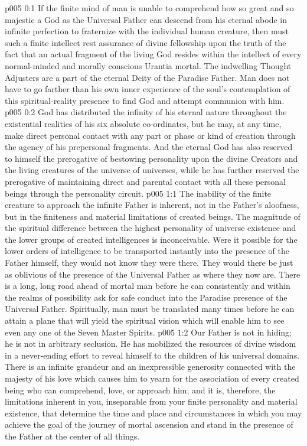 \author{Divine Counselor}
\vs p005 0:1 If the finite mind of man is unable to comprehend how so great and so majestic a God as the Universal Father can descend from his eternal abode in infinite perfection to fraternize with the individual human creature, then must such a finite intellect rest assurance of divine fellowship upon the truth of the fact that an actual fragment of the living God resides within the intellect of every normal\hyp{}minded and morally conscious Urantia mortal. The indwelling Thought Adjusters are a part of the eternal Deity of the Paradise Father. Man does not have to go farther than his own inner experience of the soul’s contemplation of this spiritual\hyp{}reality presence to find God and attempt communion with him.
\vs p005 0:2 God has distributed the infinity of his eternal nature throughout the existential realities of his six absolute co\hyp{}ordinates, but he may, at any time, make direct personal contact with any part or phase or kind of creation through the agency of his prepersonal fragments. And the eternal God has also reserved to himself the prerogative of bestowing personality upon the divine Creators and the living creatures of the universe of universes, while he has further reserved the prerogative of maintaining direct and parental contact with all these personal beings through the personality circuit.
\vs p005 1:1 The inability of the finite creature to approach the infinite Father is inherent, not in the Father’s aloofness, but in the finiteness and material limitations of created beings. The magnitude of the spiritual difference between the highest personality of universe existence and the lower groups of created intelligences is inconceivable. Were it possible for the lower orders of intelligence to be transported instantly into the presence of the Father himself, they would not know they were there. They would there be just as oblivious of the presence of the Universal Father as where they now are. There is a long, long road ahead of mortal man before he can consistently and within the realms of possibility ask for safe conduct into the Paradise presence of the Universal Father. Spiritually, man must be translated many times before he can attain a plane that will yield the spiritual vision which will enable him to see even any one of the Seven Master Spirits.
\vs p005 1:2 Our Father is not in hiding; he is not in arbitrary seclusion. He has mobilized the resources of divine wisdom in a never\hyp{}ending effort to reveal himself to the children of his universal domains. There is an infinite grandeur and an inexpressible generosity connected with the majesty of his love which causes him to yearn for the association of every created being who can comprehend, love, or approach him; and it is, therefore, the limitations inherent in you, inseparable from your finite personality and material existence, that determine the time and place and circumstances in which you may achieve the goal of the journey of mortal ascension and stand in the presence of the Father at the center of all things.
